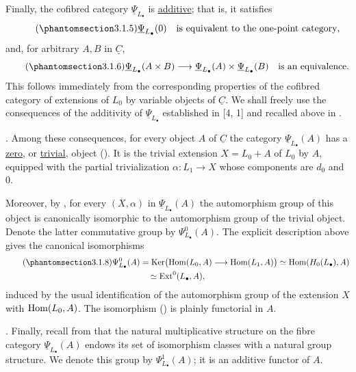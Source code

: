 Finally, the cofibred category $\underline\Psi_{L_\bullet}$ is
\underline{additive}; that is, it satisfies
\begin{equation}\tag{\SGARefTarget{sga7.sga7i.evii.n3-1-5}{3.1.5}}
 \underline\Psi_{L_\bullet}(0)
 \quad\text{is equivalent to the one-point category},
\end{equation}
and, for arbitrary $A,B$ in $\underline C$,
\begin{equation}\tag{\SGARefTarget{sga7.sga7i.evii.n3-1-6}{3.1.6}}
 \underline\Psi_{L_\bullet}(A\times B)
 \longrightarrow
 \underline\Psi_{L_\bullet}(A)\times
 \underline\Psi_{L_\bullet}(B)
 \quad\text{is an equivalence}.
\end{equation}
This follows immediately from the corresponding properties of the
cofibred category of extensions of $L_0$ by variable objects of
$\underline C$. We shall freely use the consequences of the
additivity of $\underline\Psi_{L_\bullet}$ established in [4, 1] and
recalled above in .

. Among these consequences, for every object $A$ of
$\underline C$ the category $\underline\Psi_{L_\bullet}(A)$ has a
\underline{zero}, or \underline{trivial}, object (). It is the
trivial extension $X=L_0+A$ of $L_0$ by $A$, equipped with the
partial trivialization $\alpha:L_1\longrightarrow X$ whose components
are $d_0$ and $0$.

Moreover, by , for every $(X,\alpha)$ in
$\underline\Psi_{L_\bullet}(A)$ the automorphism group of this object
is canonically isomorphic to the automorphism group of the trivial
object. Denote the latter commutative group by
$\Psi^0_{L_\bullet}(A)$. The explicit description above gives the
canonical isomorphisms
\begin{multline}\tag{\SGARefTarget{sga7.sga7i.evii.n3-1-8}{3.1.8}}
 \Psi^0_{L_\bullet}(A)
 =\Ker\bigl(\Hom(L_0,A)\longrightarrow\Hom(L_1,A)\bigr)
 \simeq\Hom(H_0(L_\bullet),A)\\
 \simeq\Ext^0(L_\bullet,A),
\end{multline}
induced by the usual identification of the automorphism group of the
extension $X$ with $\operatorname{Hom}(L_0,A)$. The isomorphism () is plainly
functorial in $A$.

. Finally, recall from  that the natural multiplicative
structure on the fibre category $\underline\Psi_{L_\bullet}(A)$
endows its set of isomorphism classes with a natural group structure.
We denote this group by $\Psi^1_{L_\bullet}(A)$; it is an additive
functor of $A$.

